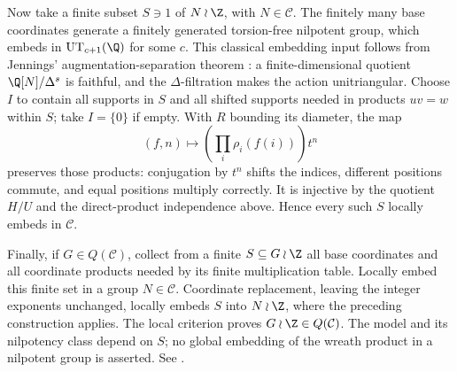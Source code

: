 Now take a finite subset \(S\ni1\) of \(N\wr\Z\), with
\(N\in\mathcal C\).
The finitely many base coordinates generate a finitely generated
torsion-free nilpotent group, which embeds in
\(\mathrm{UT}_{c+1}(\Q)\) for some \(c\).
This classical embedding input follows from Jennings'
augmentation-separation theorem \cite[Theorem~5.2]{jennings}:
a finite-dimensional quotient \(\Q[N]/\Delta^s\) is faithful,
and the \(\Delta\)-filtration makes the action unitriangular.
Choose \(I\) to contain all supports in \(S\) and all shifted supports
needed in products \(uv=w\) within \(S\); take \(I=\{0\}\) if empty.
With \(R\) bounding its diameter, the map
\[
 (f,n)\longmapsto\left(\prod_i\rho_i(f(i))\right)t^n
\]
preserves those products: conjugation by \(t^n\) shifts the indices,
different positions commute, and equal positions multiply correctly.
It is injective by the quotient \(H/U\) and the direct-product
independence above. Hence every such \(S\) locally embeds in \(\mathcal C\).

Finally, if \(G\in Q(\mathcal C)\), collect from a finite
\(S\subseteq G\wr\Z\) all base coordinates and all coordinate products
needed by its finite multiplication table.
Locally embed this finite set in a group \(N\in\mathcal C\).
Coordinate replacement, leaving the integer exponents unchanged,
locally embeds \(S\) into \(N\wr\Z\), where the preceding construction
applies. The local criterion proves \(G\wr\Z\in Q(\mathcal C)\).
The model and its nilpotency class depend on \(S\); no global
embedding of the wreath product in a nilpotent group is asserted.
See .
